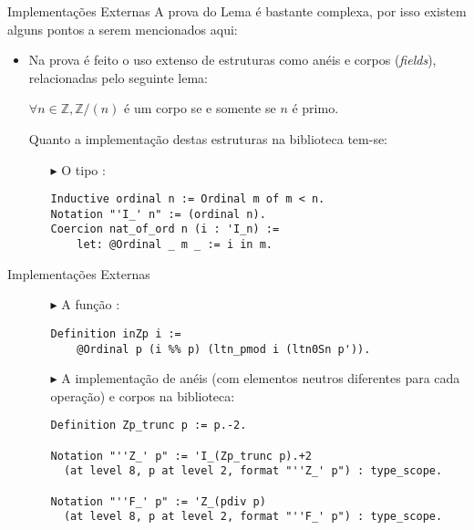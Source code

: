 \begin{frame}[fragile]{Implementações Externas}
    A prova do Lema  é bastante complexa, por isso existem alguns pontos a serem mencionados aqui:
    \begin{itemize}
        \item Na prova é feito o uso extenso de estruturas como anéis e corpos (\textit{fields}), relacionadas pelo seguinte lema:
            \begin{lema} \label{lema : anel:corpo}
                $\forall n \in \mathbb{Z}, \mathbb{Z}/(n)$ é um corpo se e somente se $n$ é primo. 
            \end{lema}
        Quanto a implementação destas estruturas na biblioteca tem-se:
            \begin{itemize}
                \item[$\blacktriangleright$] O tipo :
                
                    \begin{lstlisting}[language=coq,frame=single,tabsize=1]
Inductive ordinal n := Ordinal m of m < n.
Notation "'I_' n" := (ordinal n).
Coercion nat_of_ord n (i : 'I_n) := 
    let: @Ordinal _ m _ := i in m.
                    \end{lstlisting}
            \end{itemize}
    \end{itemize}
\end{frame}

\begin{frame}[fragile]{Implementações Externas}
    \begin{itemize}
        \item[] 
            \begin{itemize}
                \item[$\blacktriangleright$] A função :
                    \begin{lstlisting}[language=coq,frame=single,tabsize=1]
Definition inZp i := 
    @Ordinal p (i %% p) (ltn_pmod i (ltn0Sn p')).
                    \end{lstlisting}
                \item[$\blacktriangleright$] A implementação de anéis (com elementos neutros diferentes para cada operação) e corpos na biblioteca:
                    \begin{lstlisting}[language=coq,frame=single,tabsize=1]
Definition Zp_trunc p := p.-2.

Notation "''Z_' p" := 'I_(Zp_trunc p).+2
  (at level 8, p at level 2, format "''Z_' p") : type_scope.

Notation "''F_' p" := 'Z_(pdiv p)
  (at level 8, p at level 2, format "''F_' p") : type_scope.
                    \end{lstlisting}
            \end{itemize}
    \end{itemize}
\end{frame}

